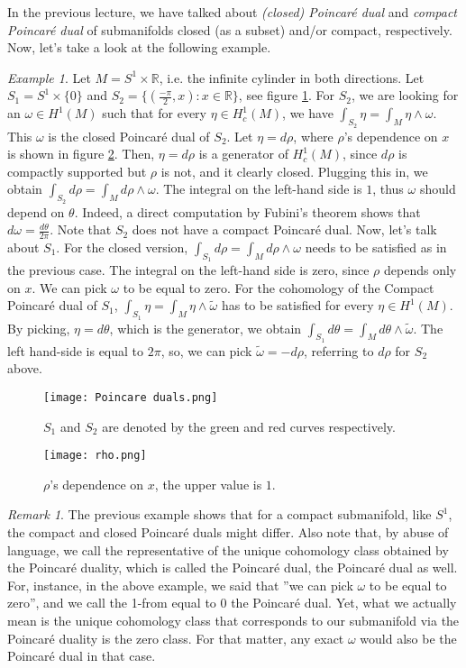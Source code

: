 \documentclass[12pt]{amsart}
\newcommand{\R}{\mathbb{R}} %
\theoremstyle{remark}
\newtheorem{remark}{Remark}
\newtheorem{example}{Example}
\begin{document}
 In the previous lecture, we have talked about \textit{(closed) Poincaré dual} and \textit{compact Poincaré dual} of submanifolds closed (as a subset) and/or compact, respectively. Now, let's take a look at the following example.
 \begin{example}
 Let $M=S^1\times \R$, i.e. the infinite cylinder in both directions. Let $S_1=S^1\times \{0 \}$ and $S_2=\{(\frac{-\pi}{2},x): x\in\R\}$, see figure \ref{fig:Poincaré duals}. For $S_2$, we are looking for an $\omega\in H^1(M)$ such that for every $\eta\in H_c^1(M)$, we have $\int_{S_2}\eta=\int_M\eta\wedge \omega$. This $\omega$ is the closed Poincaré dual of $S_2$. Let $\eta=d\rho$, where $\rho$'s dependence on $x$ is shown in figure \ref{fig:rho}. Then, $\eta=d\rho$ is a generator of $H_c^1(M)$, since $d\rho$ is compactly supported but $\rho$ is not, and it clearly closed. Plugging this in, we obtain $\int_{S_2}d\rho=\int_Md\rho\wedge \omega$. The integral on the left-hand side is $1$,  thus $\omega$ should depend on $\theta$. Indeed, a direct computation by Fubini's theorem shows that $d\omega=\frac{d\theta}{2\pi}$. Note that $S_2$ does not have a compact Poincaré dual. Now, let's talk about $S_1$. For the closed version, $\int_{S_1}d\rho=\int_M d\rho\wedge \omega$ needs to be satisfied as in the previous case. The integral on the left-hand side is zero, since $\rho$ depends only on $x$. We can pick $\omega$ to be equal to zero. For the cohomology of the Compact Poincaré dual of $S_1$, $\int_{S_1}\eta=\int_M\eta\wedge \tilde{\omega}$ has to be satisfied for every $\eta\in H^1(M)$. By picking, $\eta=d\theta$, which is the generator, we obtain $\int_{S_1}d\theta=\int_M d\theta\wedge\tilde{\omega}$. The left hand-side is equal to $2\pi$, so, we can pick $\tilde{\omega}=-d\rho$, referring to $d\rho$ for $S_2$ above.
 \end{example} 
 \begin{figure}[!ht]
	\centering
	\texttt{[image: Poincare duals.png]}
    \caption{$S_1$ and $S_2$ are denoted by the green and red curves respectively.}
    \label{fig:Poincaré duals}
\end{figure}
 \begin{figure}[!ht]
	\centering
	\texttt{[image: rho.png]}
    \caption{$\rho$'s dependence on $x$, the upper value is $1$.}
    \label{fig:rho}
\end{figure}
\begin{remark}
The previous example shows that for a compact submanifold, like $S^1$, the compact and closed Poincaré duals might differ. Also note that, by abuse of language, we call the representative of the unique cohomology class obtained by the Poincaré duality, which is called the Poincaré dual, the Poincaré dual as well. For, instance, in the above example, we said that ''we can pick $\omega$ to be equal to zero'', and we call the 1-from equal to 0 the Poincaré dual. Yet, what we actually mean is the unique cohomology class that corresponds to our submanifold via the Poincaré duality is the zero class. For that matter, any exact $\omega$ would also be the Poincaré dual in that case. 
\end{remark}
\end{document}
